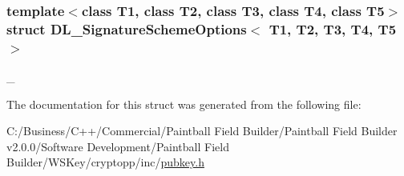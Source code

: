 \subsubsection*{template$<$class T1, class T2, class T3, class T4, class T5$>$ struct DL\_\-SignatureSchemeOptions$<$ T1, T2, T3, T4, T5 $>$}

\_\- 

The documentation for this struct was generated from the following file:\begin{DoxyCompactItemize}
\item 
C:/Business/C++/Commercial/Paintball Field Builder/Paintball Field Builder v2.0.0/Software Development/Paintball Field Builder/WSKey/cryptopp/inc/\hyperlink{pubkey_8h}{pubkey.h}\end{DoxyCompactItemize}
